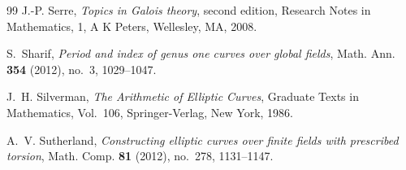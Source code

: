 \documentclass[11pt,a4paper]{amsart}
\theoremstyle{definition}
\numberwithin{equation}{section}
\begin{document}
\begin{thebibliography}{99}
J.-P. Serre,
\emph{Topics in Galois theory},
second edition,
Research Notes in Mathematics, 1,
A K Peters, Wellesley, MA, 2008.

S.~Sharif,
\emph{Period and index of genus one curves over global fields},
Math. Ann. {\bf 354} (2012), no.~3, 1029--1047.

J.~H. Silverman,
\emph{The Arithmetic of Elliptic Curves},
Graduate Texts in Mathematics, Vol.~106,
Springer-Verlag, New York, 1986.

A.~V. Sutherland,
\emph{Constructing elliptic curves over finite fields with prescribed torsion},
Math. Comp. \textbf{81} (2012), no.~278, 1131--1147.
\end{thebibliography}
\end{document}
